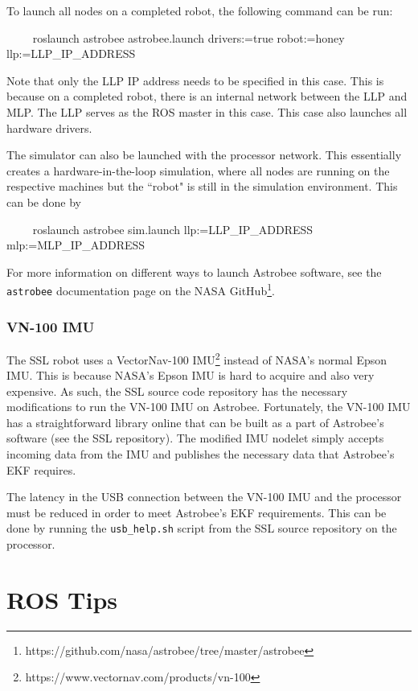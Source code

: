 \documentclass{article}
\begin{document}
To launch all nodes on a completed robot, the following command can be run:
\begin{markdown}
~~~~
roslaunch astrobee astrobee.launch drivers:=true robot:=honey llp:={LLP_IP_ADDRESS}
~~~~
\end{markdown}
Note that only the LLP IP address needs to be specified in this case. This is because on a completed robot, there is an internal network between the LLP and MLP. The LLP serves as the ROS master in this case. This case also launches all hardware drivers.

The simulator can also be launched with the processor network. This essentially creates a hardware-in-the-loop simulation, where all nodes are running on the respective machines but the ``robot" is still in the simulation environment. This can be done by
\begin{markdown}
~~~~
roslaunch astrobee sim.launch llp:={LLP_IP_ADDRESS} mlp:={MLP_IP_ADDRESS}
~~~~
\end{markdown}

For more information on different ways to launch Astrobee software, see the \texttt{astrobee} documentation page on the NASA GitHub\footnote{https://github.com/nasa/astrobee/tree/master/astrobee}.

\subsubsection{VN-100 IMU}

The SSL robot uses a VectorNav-100 IMU\footnote{https://www.vectornav.com/products/vn-100} instead of NASA's normal Epson IMU. This is because NASA's Epson IMU is hard to acquire and also very expensive. As such, the SSL source code repository has the necessary modifications to run the VN-100 IMU on Astrobee. Fortunately, the VN-100 IMU has a straightforward library online that can be built as a part of Astrobee's software (see the SSL repository). The modified IMU nodelet simply accepts incoming data from the IMU and publishes the necessary data that Astrobee's EKF requires.

The latency in the USB connection between the VN-100 IMU and the processor must be reduced in order to meet Astrobee's EKF requirements. This can be done by running the \texttt{usb\_help.sh} script from the SSL source repository on the processor.


\clearpage
\section{ROS Tips}
\end{document}
